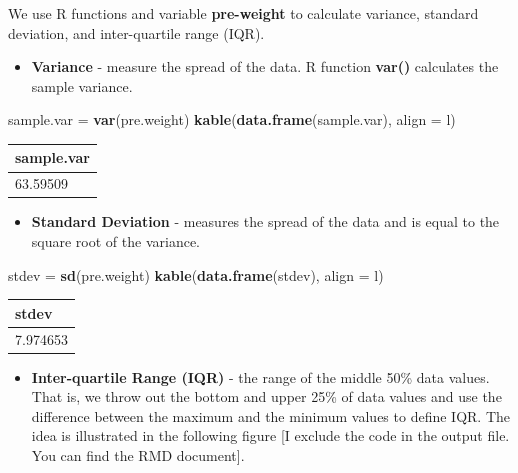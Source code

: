 \documentclass[
]{book}
\newenvironment{Shaded}{\begin{snugshade}}{\end{snugshade}}
\newcommand{\AttributeTok}[1]{\textcolor[rgb]{0.13,0.29,0.53}{#1}}
\newcommand{\FunctionTok}[1]{\textcolor[rgb]{0.13,0.29,0.53}{\textbf{#1}}}
\newcommand{\NormalTok}[1]{#1}
\newcommand{\OtherTok}[1]{\textcolor[rgb]{0.56,0.35,0.01}{#1}}
\newcommand{\StringTok}[1]{\textcolor[rgb]{0.31,0.60,0.02}{#1}}
\providecommand{\tightlist}{%
  \setlength{\itemsep}{0pt}\setlength{\parskip}{0pt}}
\begin{document}
We use R functions and variable \textbf{pre-weight} to calculate variance, standard deviation, and inter-quartile range (IQR).

\begin{itemize}
\tightlist
\item
  \textbf{Variance} - measure the spread of the data. R function \textbf{var()} calculates the sample variance.
\end{itemize}

\begin{Shaded}
\begin{Highlighting}[]
\NormalTok{sample.var }\OtherTok{=} \FunctionTok{var}\NormalTok{(pre.weight)}
\FunctionTok{kable}\NormalTok{(}\FunctionTok{data.frame}\NormalTok{(sample.var), }\AttributeTok{align =} \StringTok{\textquotesingle{}l\textquotesingle{}}\NormalTok{)}
\end{Highlighting}
\end{Shaded}

\begin{tabular}{l}
\hline
sample.var\\
\hline
63.59509\\
\hline
\end{tabular}

\begin{itemize}
\tightlist
\item
  \textbf{Standard Deviation} - measures the spread of the data and is equal to the square root of the variance.
\end{itemize}

\begin{Shaded}
\begin{Highlighting}[]
\NormalTok{stdev }\OtherTok{=} \FunctionTok{sd}\NormalTok{(pre.weight)}
\FunctionTok{kable}\NormalTok{(}\FunctionTok{data.frame}\NormalTok{(stdev), }\AttributeTok{align =} \StringTok{\textquotesingle{}l\textquotesingle{}}\NormalTok{)}
\end{Highlighting}
\end{Shaded}

\begin{tabular}{l}
\hline
stdev\\
\hline
7.974653\\
\hline
\end{tabular}

\begin{itemize}
\tightlist
\item
  \textbf{Inter-quartile Range (IQR)} - the range of the middle 50\% data values. That is, we throw out the bottom and upper 25\% of data values and use the difference between the maximum and the minimum values to define IQR. The idea is illustrated in the following figure {[}I exclude the code in the output file. You can find the RMD document{]}.
\end{itemize}
\end{document}
